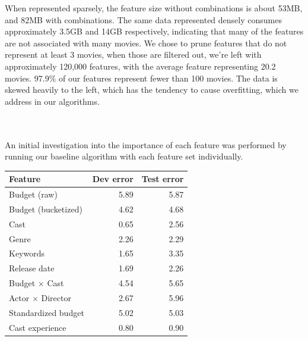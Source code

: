 \documentclass[journal]{IEEEtran}
\begin{document}
When represented sparsely, the feature size without combinations is about 53MB, and 82MB with combinations.  The same data represented
densely consumes approximately 3.5GB and 14GB respectively, indicating that many of the features are not associated with many movies.  We chose to prune features that do not represent at least 3 movies, when
those are filtered out, we're left with approximately 120,000 features, with the average feature
representing 20.2 movies. 97.9\% of our features represent fewer than 100 movies.  The data
is skewed heavily to the left, which has the tendency to cause overfitting, which we address in
our algorithms. \\
\\
\\
\par An initial investigation into the importance of each feature was performed by
running our baseline algorithm with each feature set individually.\\

\begin{center}
\begin{tabular}{|l|r r|} %
\hline
Feature & Dev error & Test error \\ [0.5ex] %
\hline %
Budget (raw) & 5.89 & 5.87 \\ %
Budget (bucketized) & 4.62 & 4.68 \\
Cast & 0.65 & 2.56 \\
Genre & 2.26 & 2.29 \\
Keywords & 1.65 & 3.35 \\
Release date & 1.69 & 2.26 \\
\hline
Budget $\times$ Cast & 4.54 & 5.65 \\
Actor $\times$ Director & 2.67 & 5.96 \\
\hline
Standardized budget & 5.02 & 5.03 \\
Cast experience & 0.80 & 0.90 \\
\hline
\end{tabular}
\end{center}
\smallskip
\end{document}
